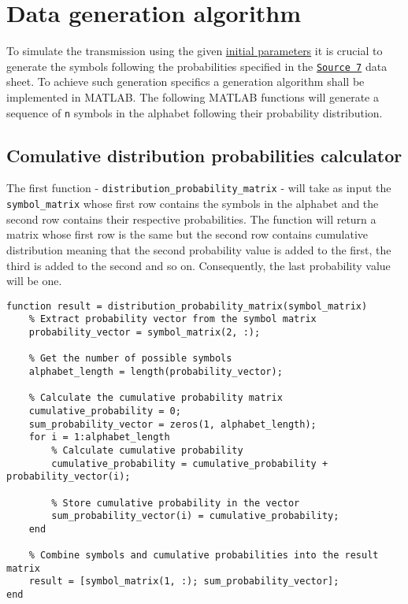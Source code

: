 \section{Data generation algorithm}
To simulate the transmission using the given \hyperref[initial-parameters]{initial parameters} it is crucial to generate the symbols following the probabilities specified in the \hyperref[tab:source7]{\texttt{Source 7}} data sheet. To achieve such generation specifics a generation algorithm shall be implemented in MATLAB. The following MATLAB functions will generate a sequence of \texttt{n} symbols in the alphabet following their probability distribution.  

\subsection{Comulative distribution probabilities calculator}
The first function - \texttt{distribution\_probability\_matrix} - will take as input the \texttt{symbol\_matrix} whose first row contains the symbols in the alphabet and the second row contains their respective probabilities. The function will return a matrix whose first row is the same but the second row contains cumulative distribution meaning that the second probability value is added to the first, the third is added to the second and so on. Consequently, the last probability value will be one.

\begin{lstlisting}
function result = distribution_probability_matrix(symbol_matrix)
    % Extract probability vector from the symbol matrix
    probability_vector = symbol_matrix(2, :);
    
    % Get the number of possible symbols
    alphabet_length = length(probability_vector);

    % Calculate the cumulative probability matrix
    cumulative_probability = 0;
    sum_probability_vector = zeros(1, alphabet_length);
    for i = 1:alphabet_length
        % Calculate cumulative probability
        cumulative_probability = cumulative_probability + probability_vector(i);
        
        % Store cumulative probability in the vector
        sum_probability_vector(i) = cumulative_probability;
    end

    % Combine symbols and cumulative probabilities into the result matrix
    result = [symbol_matrix(1, :); sum_probability_vector];
end
\end{lstlisting}

